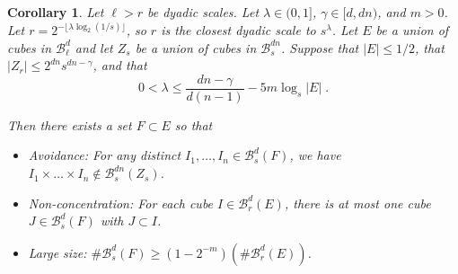 \documentclass[usenames,dvipsnames,letterpaper, reqno,11pt]{article}
\theoremstyle{plain}
\newtheorem{corollary}{Corollary}
\theoremstyle{plain}
\begin{document}
\begin{corollary}\label{discreteScaleCor}
	Let $\ell>r$ be dyadic scales. Let $\lambda \in (0,1]$, $\gamma \in [d,dn)$, and $m > 0$. Let $r = 2^{- \lfloor \lambda \log_2(1/s) \rfloor}$, so $r$ is the closest dyadic scale to $s^\lambda$. Let $E$ be a union of cubes in $\mathcal{B}^d_\ell$ and let $Z_s$ be a union of cubes in $\mathcal{B}^{dn}_s$. Suppose that $|E| \leq 1/2$, that $|Z_r| \leq 2^{dn} s^{dn-\gamma}$, and that 
\begin{equation}\label{lambdaIneq} 
0 < \lambda \leq \frac{dn - \gamma}{d(n-1)} - 5 m \log_s |E|\; .
\end{equation}
	
	Then there exists a set $F\subset E$ so that
	\begin{itemize}
		\item[(A)] \emph{Avoidance}:  For any distinct $I_1, \dots, I_n \in \mathcal{B}^d_s(F)$, we have $I_1 \times \dots \times I_n \not \in \mathcal{B}^{dn}_s(Z_s)$.
		\item[(B)] \emph{Non-concentration}: For each cube $I \in \mathcal{B}^d_r(E)$, there is at most one cube $J\in \mathcal{B}^d_s(F)$ with $J\subset I$. 
		\item[(C)] \emph{Large size}: $\# \mathcal{B}^d_s(F) \geq (1-2^{-m}) (\# \mathcal{B}^d_r(E)) $.
	\end{itemize}
\end{corollary}
\end{document}
